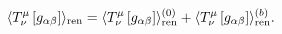 \begin{equation}
\langle T_{\nu }^{\mu }\left[ g_{\alpha \beta }\right] \rangle _{{\rm ren}%
}=\langle T_{\nu }^{\mu }\left[ g_{\alpha \beta }\right] \rangle _{{\rm ren}%
}^{(0)}+\langle T_{\nu }^{\mu }\left[ g_{\alpha \beta }\right] \rangle _{%
{\rm ren}}^{(b)}.  \label{emtcurved1}
\end{equation}

